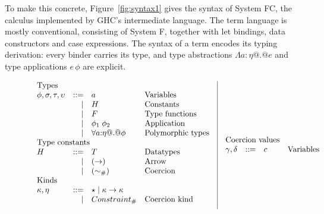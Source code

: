 \documentclass[a4paper,UKenglish]{lipics}
\newcommand{\psim}{\mathrel{\sim_{\tiny \#}}}
\newcommand{\static}{\textsf{$Constraint_{\#}$}}
\begin{document}
To make this concrete, Figure~\ref{fig:syntax1} gives the syntax of
System FC, the calculus implemented by GHC's intermediate language.
The term language is mostly conventional, consisting of System F,
together with let bindings, data constructors and case expressions.
The syntax of a term encodes its typing derivation: every binder
carries its type, and type abstractions $\Lambda a{:}\eta@.@e$ and
type applications $e\,\phi$ are explicit. 

\begin{figure}\small
\[\begin{array}{l|l} 
\begin{array}{lrll}
\multicolumn{3}{l}{\text{Types}}               \\ 
\phi,\sigma,\tau,\upsilon & ::= & a        & \text{Variables}   \\ 
        & \mid    & H        & \text{Constants}   \\ 
        & \mid    & F &           \text{Type functions}    \\ 
        & \mid & \phi_1\;\phi_2      & \text{Application} \\ 
        & \mid & \forall a{:}\eta @.@ \phi  & \text{Polymorphic types} \\
\multicolumn{3}{l}{\text{Type constants}}           \\ 
H & ::= & T &           \text{Datatypes}          \\ 
  & \mid    & (\to)   &       \text{Arrow}             \\ 
  & \mid    & (\psim) &  \text{Coercion} \\ 
\multicolumn{3}{l}{\text{Kinds}} \\ 
       \kappa,\eta & ::= & \star \mid \kappa \to \kappa \\ 
           & \mid   & \static & \text{Coercion kind} \\[2mm]
\end{array} & 
\begin{array}{lrll}
\multicolumn{3}{l}{\text{Coercion values}} \\ 
\gamma,\delta & ::= & c        & \text{Variables} \\ 

\end{array}
\end{array}\]
\end{figure}
\end{document}
